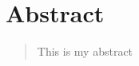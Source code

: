 \documentclass[11pt, a4paper, onecolumn, fleqn, twoside, titlepage, openright]{book}
\begin{document}
	\clearpage


	\chapter*{Abstract}
	\label{abstract}

	\begin{quote}
		This is my abstract
	\end{quote}


	\tableofcontents	


	


	



	
\end{document}
